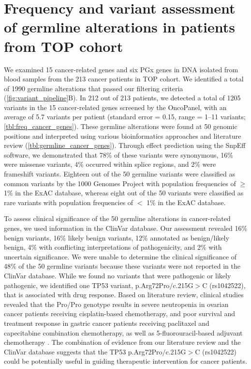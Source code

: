 \newpage
\section{Frequency and variant assessment of germline alterations in patients from TOP cohort}
\label{sec:FrequencyandvariantassessmentofgermlinealterationsinpatientsfromTOPcohort}

We examined 15 cancer-related genes and six PGx genes in DNA isolated from blood samples from the 213 cancer patients in TOP cohort. We identified a total of 1990 germline alterations that passed our filtering criteria (\autoref{fig:variant_pipeline}B). In 212 out of 213 patients, we detected a total of 1205 variants in the 15 cancer-related genes screened by the OncoPanel, with an average of 5.7 variants per patient (standard error = 0.15, range = 1--11 variants; \autoref{tbl:freq_cancer_genes}). These germline alterations were found at 50 genomic positions and interpreted using various bioinformatics approaches and literature review (\autoref{tbl:germline_cancer_genes}). Through effect prediction using the SnpEff software, we demonstrated that 78\% of these variants were synonymous, 16\% were missense variants, 4\% occurred within splice regions, and 2\% were frameshift variants. Eighteen out of the 50 germline variants were classified as common variants by the 1000 Genomes Project with population frequencies of $\geq$ 1\% in the ExAC database, whereas eight out of the 50 variants were classified as rare variants with population frequencies of $<$ 1\% in the ExAC database.

To assess clinical significance of the 50 germline alterations in cancer-related genes, we used information in the ClinVar database. Our assessment revealed 16\% benign variants, 16\% likely benign variants, 12\% annotated as benign/likely benign, 4\% with conflicting interpretations of pathogenicity, and 2\% with uncertain significance. We were unable to determine the clinical significance of 48\% of the 50 germline variants because these variants were not reported in the ClinVar database. While we found no variants that were pathogenic or likely pathogenic, we identified one TP53 variant, p.Arg72Pro$/$c.215G$>$C (rs1042522), that is associated with drug response. Based on literature review, clinical studies revealed that the Pro/Pro genotype results in severe neutropenia in ovarian cancer patients receiving cisplatin-based chemotherapy, and poor survival and treatment response in gastric cancer patients receiving paclitaxel and capecitabine combination chemotherapy, as well as 5-fluorouracil-based adjuvant chemotherapy \cite{}. The combination of evidence from our literature review and the ClinVar database suggests that the TP53 p.Arg72Pro$/$c.215G$>$C (rs1042522) could be potentially useful in guiding therapeutic intervention for cancer patients.


